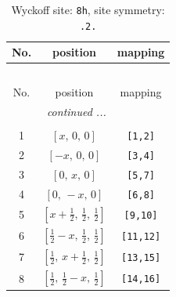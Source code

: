 \documentclass[fleqn,8pt]{jsarticle}
\begin{document}
\begin{longtable}{ccc}
\caption{Wyckoff site: {\tt 8h}, site symmetry: {\tt .2.}}
 \\
 \hline \hline
No. & position & mapping \\ \hline \endfirsthead

\multicolumn{2}{l}{\tablename\ \thetable{}} \\
 \hline \hline
No. & position & mapping \\ \hline \endhead

 \hline \hline
\multicolumn{2}{r}{\footnotesize\it continued ...} \\ \endfoot

 \hline \hline
\multicolumn{2}{r}{} \\ \endlastfoot

1 & $\left[ x,\, 0,\, 0 \right]$ & {\tt [1,2]} \\ \hline
2 & $\left[ - x,\, 0,\, 0 \right]$ & {\tt [3,4]} \\ \hline
3 & $\left[ 0,\, x,\, 0 \right]$ & {\tt [5,7]} \\ \hline
4 & $\left[ 0,\, - x,\, 0 \right]$ & {\tt [6,8]} \\ \hline
5 & $\left[ x + \frac{1}{2},\, \frac{1}{2},\, \frac{1}{2} \right]$ & {\tt [9,10]} \\ \hline
6 & $\left[ \frac{1}{2} - x,\, \frac{1}{2},\, \frac{1}{2} \right]$ & {\tt [11,12]} \\ \hline
7 & $\left[ \frac{1}{2},\, x + \frac{1}{2},\, \frac{1}{2} \right]$ & {\tt [13,15]} \\ \hline
8 & $\left[ \frac{1}{2},\, \frac{1}{2} - x,\, \frac{1}{2} \right]$ & {\tt [14,16]} \\
\end{longtable}
\renewcommand{\arraystretch}{1.2}
\end{document}
